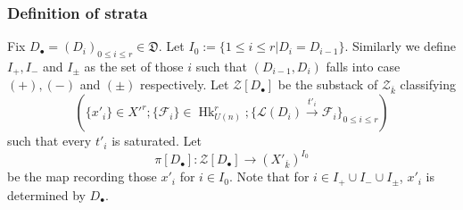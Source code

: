 \documentclass[reqno]{amsart}
\numberwithin{equation}{section}
\newcommand{\F}{\mathbf{F}}
\newcommand{\ol}[1]{\overline{#1}}
\DeclareMathOperator{\Hk}{Hk}
\newcommand{\isom}{\stackrel{\sim}{\to}}
\newcommand{\bu}{\bullet}
\newcommand\xr{\xrightarrow}
\newcommand\cF{\mathcal{F}}
\newcommand\cL{\mathcal{L}}
\newcommand\cZ{\mathcal{Z}}
\newcommand\frD{\mathfrak{D}}
\theoremstyle{remark}
\numberwithin{equation}{section}
\begin{document}
\subsubsection{Definition of strata} Fix $D_{\bu}=(D_{i})_{0\le i\le r}\in \frD$. Let $I_{0} :=\{1\le i\le r|D_{i}=D_{i-1}\}$. Similarly we define $I_{+}, I_{-}$ and $I_{\pm}$ as the set of those $i$ such that $(D_{i-1}, D_{i})$ falls into case $(+),(-)$ and $(\pm)$  respectively. Let $\cZ[D_{\bu}]$ be the substack of $\cZ_{\ol{k}}$ classifying 
\[
(\{x'_{i}\}\in X'^{r}; \{\cF_{i}\}\in \Hk^{r}_{U(n)}; \{\cL(D_{i})\xr{t'_{i}}\cF_{i}\}_{0\le i\le r})
\]
such that every $t'_{i}$ is saturated. Let 
\begin{equation}
\pi[D_{\bu}]: \cZ[D_{\bu}]\to  (X'_{\ol{k}})^{I_{0}}
\end{equation}
be the map recording those $x'_{i}$ for $i\in I_{0}$. Note that for $i\in I_{+}\cup I_{-}\cup I_{\pm}$, $x'_{i}$ is determined by $D_{\bu}$.


\end{document}
